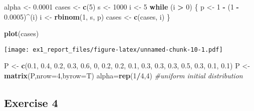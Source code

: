 \documentclass[]{article}
\newenvironment{Shaded}{\begin{snugshade}}{\end{snugshade}}
\newcommand{\CommentTok}[1]{\textcolor[rgb]{0.56,0.35,0.01}{\textit{#1}}}
\newcommand{\ControlFlowTok}[1]{\textcolor[rgb]{0.13,0.29,0.53}{\textbf{#1}}}
\newcommand{\DataTypeTok}[1]{\textcolor[rgb]{0.13,0.29,0.53}{#1}}
\newcommand{\DecValTok}[1]{\textcolor[rgb]{0.00,0.00,0.81}{#1}}
\newcommand{\FloatTok}[1]{\textcolor[rgb]{0.00,0.00,0.81}{#1}}
\newcommand{\KeywordTok}[1]{\textcolor[rgb]{0.13,0.29,0.53}{\textbf{#1}}}
\newcommand{\NormalTok}[1]{#1}
\newcommand{\OperatorTok}[1]{\textcolor[rgb]{0.81,0.36,0.00}{\textbf{#1}}}
\newcommand{\StringTok}[1]{\textcolor[rgb]{0.31,0.60,0.02}{#1}}
\begin{document}
\begin{Shaded}
\begin{Highlighting}[]
\NormalTok{alpha <-}\StringTok{ }\FloatTok{0.0001}
\NormalTok{cases <-}\StringTok{ }\KeywordTok{c}\NormalTok{(}\DecValTok{5}\NormalTok{)}
\NormalTok{s <-}\StringTok{ }\DecValTok{1000}
\NormalTok{i <-}\StringTok{ }\DecValTok{5}
\ControlFlowTok{while}\NormalTok{ (i }\OperatorTok{>}\StringTok{ }\DecValTok{0}\NormalTok{) \{}
\NormalTok{    p <-}\StringTok{ }\DecValTok{1} \OperatorTok{-}\StringTok{ }\NormalTok{(}\DecValTok{1} \OperatorTok{-}\StringTok{ }\FloatTok{0.0005}\NormalTok{)}\OperatorTok{^}\NormalTok{(i)}
\NormalTok{    i <-}\StringTok{ }\KeywordTok{rbinom}\NormalTok{(}\DecValTok{1}\NormalTok{, s, p)}
\NormalTok{    cases <-}\StringTok{ }\KeywordTok{c}\NormalTok{(cases, i)}
\NormalTok{\}}
\end{Highlighting}
\end{Shaded}

\begin{Shaded}
\begin{Highlighting}[]
\KeywordTok{plot}\NormalTok{(cases)}
\end{Highlighting}
\end{Shaded}

\texttt{[image: ex1\_report\_files/figure-latex/unnamed-chunk-10-1.pdf]}

\begin{Shaded}
\begin{Highlighting}[]
\NormalTok{P <-}\StringTok{ }\KeywordTok{c}\NormalTok{(}\FloatTok{0.1}\NormalTok{, }\FloatTok{0.4}\NormalTok{, }\FloatTok{0.2}\NormalTok{, }\FloatTok{0.3}\NormalTok{,}
       \FloatTok{0.6}\NormalTok{,   }\DecValTok{0}\NormalTok{, }\FloatTok{0.2}\NormalTok{, }\FloatTok{0.2}\NormalTok{,}
       \FloatTok{0.1}\NormalTok{, }\FloatTok{0.3}\NormalTok{, }\FloatTok{0.3}\NormalTok{, }\FloatTok{0.3}\NormalTok{,}
       \FloatTok{0.5}\NormalTok{, }\FloatTok{0.3}\NormalTok{, }\FloatTok{0.1}\NormalTok{, }\FloatTok{0.1}\NormalTok{)}
\NormalTok{P <-}\StringTok{ }\KeywordTok{matrix}\NormalTok{(P,}\DataTypeTok{nrow=}\DecValTok{4}\NormalTok{,}\DataTypeTok{byrow=}\NormalTok{T)}
\NormalTok{alpha=}\KeywordTok{rep}\NormalTok{(}\DecValTok{1}\OperatorTok{/}\DecValTok{4}\NormalTok{,}\DecValTok{4}\NormalTok{) }\CommentTok{#uniform initial distribution}
\end{Highlighting}
\end{Shaded}

\hypertarget{exercise-4}{%
\subsection{Exercise 4}\label{exercise-4}}
\end{document}

